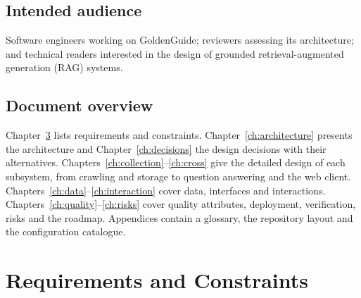 \documentclass[11pt,letterpaper]{report}
\begin{document}
\section{Intended audience}
Software engineers working on GoldenGuide; reviewers assessing its architecture; and technical readers interested in the design of
grounded retrieval-augmented generation (RAG) systems.

\section{Document overview}
Chapter~\ref{ch:requirements} lists requirements and constraints. Chapter~\ref{ch:architecture}
presents the architecture and Chapter~\ref{ch:decisions} the design decisions with their
alternatives. Chapters~\ref{ch:collection}--\ref{ch:cross} give the detailed design of each
subsystem, from crawling and storage to question answering and the web client. Chapters~\ref{ch:data}--\ref{ch:interaction}
cover data, interfaces and interactions. Chapters~\ref{ch:quality}--\ref{ch:risks} cover quality
attributes, deployment, verification, risks and the roadmap. Appendices contain a glossary, the
repository layout and the configuration catalogue.

\chapter{Requirements and Constraints}\label{ch:requirements}
\end{document}
